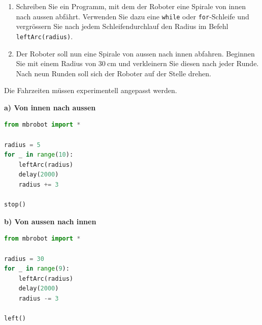 \begin{myexercise}

    \begin{center}
    \end{center}

    \begin{enumerate}
        \item Schreiben Sie ein Programm, mit dem der Roboter
              eine Spirale von innen nach aussen abfährt.
              Verwenden Sie dazu eine \texttt{while} oder \texttt{for}-Schleife
              und vergrössern Sie nach jedem Schleifendurchlauf
              den Radius im Befehl \texttt{leftArc(radius)}.

        \item Der Roboter soll nun eine Spirale von aussen
              nach innen abfahren. Beginnen Sie mit einem
              Radius von \(\SI{30}{\centi\meter}\) und
              verkleinern Sie diesen nach jeder Runde.
              Nach neun Runden soll sich der Roboter
              auf der Stelle drehen.
    \end{enumerate}


    \begin{myanswer}
        Die Fahrzeiten müssen experimentell angepasst werden.

        \textbf{a) Von innen nach aussen}

        \begin{lstlisting}[language=Python]
from mbrobot import *

radius = 5
for _ in range(10):
    leftArc(radius)
    delay(2000)
    radius += 3

stop()
    \end{lstlisting}

        \textbf{b) Von aussen nach innen}

        \begin{lstlisting}[language=Python]
from mbrobot import *

radius = 30
for _ in range(9):
    leftArc(radius)
    delay(2000)
    radius -= 3

left()
    \end{lstlisting}
    \end{myanswer}

\end{myexercise}



